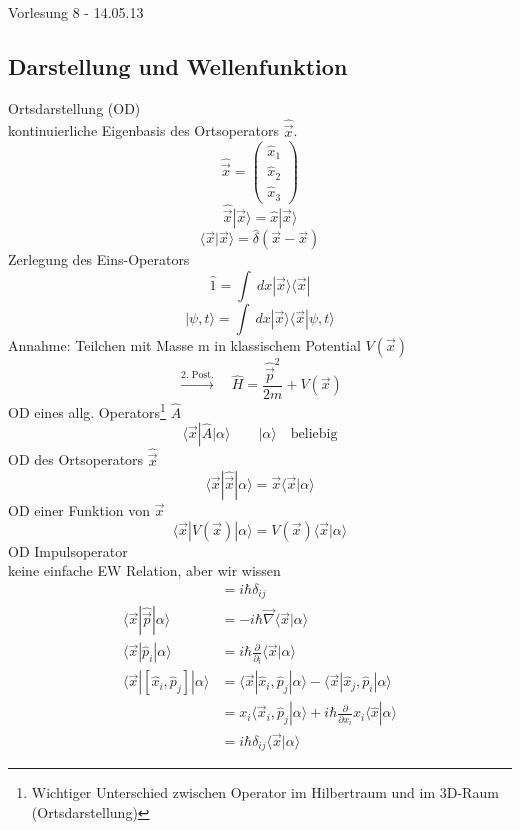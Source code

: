 \documentclass[10pt,article,colorback,accentcolor=tud9d]{scrartcl}
\begin{document}
\begin{flushright}
Vorlesung 8 - 14.05.13
\end{flushright}
 
\subsection{Darstellung und Wellenfunktion}
Ortsdarstellung (OD)\\
kontinuierliche Eigenbasis des Ortsoperators $\hat{\vec{x}}$.
$$
\hat{\vec{x}}=\left(\begin{array}{c} \hat{x}_1 \\ \hat{x}_2 \\ \hat{x}_3 \end{array}\right)
$$
$$
\hat{\vec{x}}|\vec{x}\rangle=\hat{x}|\vec{x}\rangle
$$
\begin{equation}
\langle\vec{x}|\vec{x}\rangle=\hat{\delta}(\vec{x}-\vec{x})
\end{equation}
Zerlegung des Eins-Operators
$$
\hat{1}=\int\ dx \left|\vec{x}\rangle\langle\vec{x}\right|
$$
\begin{equation}
|\psi,t\rangle=\int\ dx\left|\vec{x}\rangle\langle\vec{x}\right|\psi,t\rangle
\label{eq:WellenfunktionOrtsdarstellung}
\end{equation}
Annahme: Teilchen mit Masse m in klassischem Potential $V(\vec{x})$
\begin{equation}
\xrightarrow{\text{2. Post.}} \quad \hat{H}=\frac{\hat{\vec{p}}^2}{2m}+V(\vec{x})
\label{eq:Hamiltonoperator}
\end{equation}
OD eines allg. Operators\footnote{Wichtiger Unterschied zwischen Operator im Hilbertraum und im 3D-Raum (Ortsdarstellung)} $\hat{A}$
$$
\langle\vec{x}\left|\right.\hat{A}|\alpha\rangle \quad \quad |\alpha\rangle \quad \text{beliebig}
$$
OD des Ortsoperators $\hat{\vec{x}}$
$$
\langle\vec{x}|\hat{\vec{x}}|\alpha\rangle=\vec{x}\langle\vec{x}|\alpha\rangle
$$
OD einer Funktion von $\vec{x}$
$$
\langle\vec{x}|V(\vec{x})|\alpha\rangle=V(\vec{x})\langle\vec{x}|\alpha\rangle
$$
OD Impulsoperator\\
keine einfache EW Relation, aber wir wissen
\begin{align}
[\hat{x}_i,\hat{p}_j]&=i\hbar\delta_{ij} \nonumber\\ \nonumber
\langle\vec{x}|\hat{\vec{p}}|\alpha\rangle&=-i\hbar\vec{\nabla}\langle\vec{x}|\alpha\rangle\\ \nonumber
\langle\vec{x}|\hat{p}_i|\alpha\rangle&=i\hbar\frac{\partial}{\partial_i}\langle\vec{x}|\alpha\rangle\\ \nonumber
\langle\vec{x}|[\hat{x}_i,\hat{p}_j]|\alpha\rangle&=\langle\vec{x}|\hat{x}_i,\hat{p}_j|\alpha\rangle-\langle\vec{x}|\hat{x}_j,\hat{p}_i|\alpha\rangle\\ 
&=x_i\langle\vec{x}_i,\hat{p}_j|\alpha\rangle+i\hbar\frac{\partial}{\partial x_i}x_i\langle\hat{x}|\alpha\rangle\nonumber\\
&=i\hbar\delta_{ij}\langle\vec{x}|\alpha\rangle
\end{align}
\end{document}
